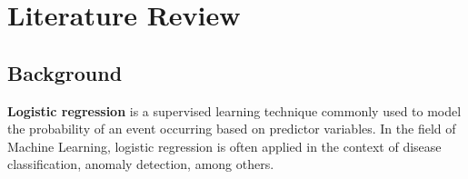 \documentclass{article}
\theoremstyle{plain}
\theoremstyle{definition}
\theoremstyle{remark}
\begin{document}



\printAffiliationsAndNotice{\icmlEqualContribution} %

\begin{abstract}

...

\end{abstract}

\section{Literature Review}
\label{submission}

\subsection{Background}

\textbf{Logistic regression} is a supervised learning technique commonly used to model the probability of an event occurring based on predictor variables. In the field of Machine Learning, logistic regression is often applied in the context of disease classification, anomaly detection, among others.
\end{document}
